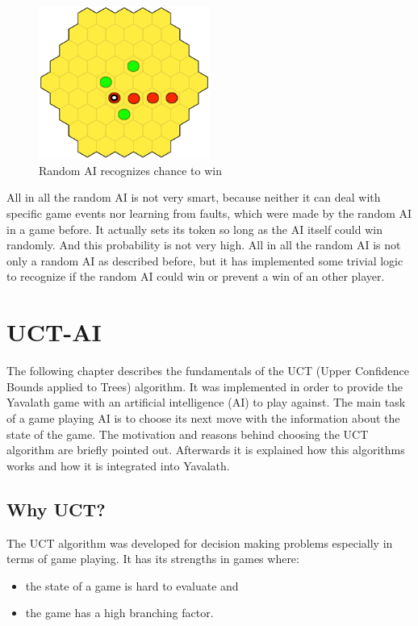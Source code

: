 \documentclass[english]{report}
\begin{document}
\begin{figure}[ht]
\centering
\includegraphics[width=0.5\textwidth]{Abbildungen/randomAI3.png}
\caption{Random AI recognizes chance to win }
\label{fig:randomAI3}
\end{figure}
All in all the random AI is not very smart, because neither it can deal with specific 
game events nor learning from faults, which were made by the random AI in a game before. It actually sets its token so long as the AI itself could win randomly. 
And this probability is not very high. All in all the random AI is not only a random AI as described before, but it has implemented some trivial logic to recognize if the random AI could win or prevent a win of an other player.


\section{UCT-AI}
\label{sec:chapter4}
The following chapter describes the fundamentals of the UCT (Upper Confidence
Bounds applied to Trees) algorithm. It was implemented in order to provide the
Yavalath game with an artificial intelligence (AI) to play against. The main
task of a game playing AI is to choose its next move with the information about
the state of the game. The motivation and reasons behind choosing the UCT
algorithm are briefly pointed out. Afterwards it is explained how this
algorithms works and how it is integrated into Yavalath.

\subsection{Why UCT?}
The UCT algorithm was developed for decision making problems especially in terms
of game playing. It has its strengths in games where:
\begin{itemize}
	\item the state of a game is hard to evaluate and
	\item the game has a high branching factor.\cite{wiki:mcts}
\end{itemize}
\end{document}
